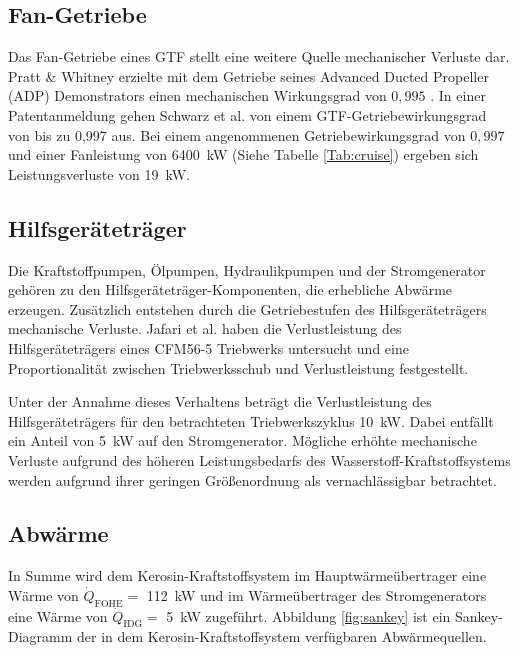 \subsection{Fan-Getriebe}

Das Fan-Getriebe eines GTF stellt eine weitere Quelle mechanischer Verluste dar. Pratt \& Whitney erzielte mit dem Getriebe seines Advanced Ducted Propeller (ADP) Demonstrators einen mechanischen Wirkungsgrad von $0,995$ \cite{MCCUNE.1993}. In einer Patentanmeldung gehen Schwarz et al. \cite{Schwarz.2013} von einem GTF-Getriebewirkungsgrad von bis zu 0,997 aus. Bei einem angenommenen Getriebewirkungsgrad von $0,997$ und einer Fanleistung von \SI{6400}{\kilo\W} (Siehe Tabelle \ref{Tab:cruise}) ergeben sich Leistungsverluste von \SI{19}{\kilo\W}.

\subsection{Hilfsgeräteträger}

Die Kraftstoffpumpen, Ölpumpen, Hydraulikpumpen und der Stromgenerator gehören zu den Hilfsgeräteträger-Komponenten, die erhebliche Abwärme erzeugen. Zusätzlich entstehen durch die Getriebestufen des Hilfsgeräteträgers mechanische Verluste. Jafari et al. \cite{Jafari.2020} haben die Verlustleistung des Hilfsgeräteträgers eines CFM56-5 Triebwerks untersucht und eine Proportionalität zwischen Triebwerksschub und Verlustleistung festgestellt. 

Unter der Annahme dieses Verhaltens beträgt die Verlustleistung des Hilfsgeräteträgers für den betrachteten Triebwerkszyklus \SI{10}{\kilo\W}. Dabei entfällt ein Anteil von \SI{5}{\kilo\W} auf den Stromgenerator. Mögliche erhöhte mechanische Verluste aufgrund des höheren Leistungsbedarfs des Wasserstoff-Kraftstoffsystems werden aufgrund ihrer geringen Größenordnung als vernachlässigbar betrachtet. 


\subsection{Abwärme}

In Summe wird dem Kerosin-Kraftstoffsystem im Hauptwärmeübertrager eine Wärme von $\dot{Q}_{\mathrm{FOHE}}=$ \SI{112}{\kilo\W} und im Wärmeübertrager des Stromgenerators eine Wärme von $\dot{Q}_{\mathrm{IDG}}=$ \SI{5}{\kilo\W} zugeführt. Abbildung \ref{fig:sankey} ist ein Sankey-Diagramm der in dem Kerosin-Kraftstoffsystem verfügbaren Abwärmequellen.

